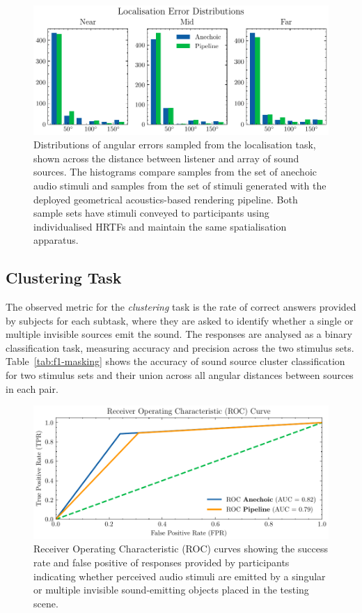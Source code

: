 \begin{figure}[htbp]
    \centering
    \includegraphics[width=1\linewidth]{7_evaluation/images/localisation_distributions.pdf}
    \caption{Distributions of angular errors sampled from the localisation task, shown across the distance between listener and array of sound sources. The histograms compare samples from the set of anechoic audio stimuli and samples from the set of stimuli generated with the deployed geometrical acoustics-based rendering pipeline. Both sample sets have stimuli conveyed to participants using individualised HRTFs and maintain the same spatialisation apparatus.}
    \label{fig:localisation-distributions}
\end{figure}

\subsection{Clustering Task}
The observed metric for the \emph{clustering} task is the rate of correct answers provided by subjects for each subtask, where they are asked to identify whether a single or multiple invisible sources emit the sound. The responses are analysed as a binary classification task, measuring accuracy and precision across the two stimulus sets. Table~\ref{tab:f1-masking} shows the accuracy of sound source cluster classification for two stimulus sets and their union across all angular distances between sources in each pair.
\begin{figure}[htbp]
    \centering
    \includegraphics[width=1\linewidth]{7_evaluation/images/masking_roc.pdf}
    \caption{Receiver Operating Characteristic (ROC) curves showing the success rate and false positive of responses provided by participants indicating whether perceived audio stimuli are emitted by a singular or multiple invisible sound-emitting objects placed in the testing scene.}
    \label{fig:masking-roc}
\end{figure}

